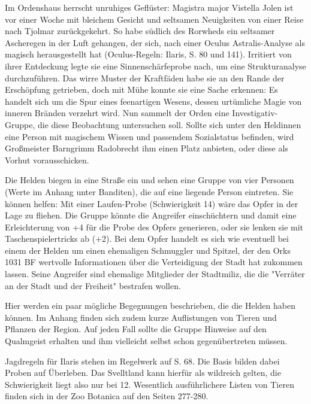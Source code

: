 Im Ordenshaus herrscht unruhiges Geflüster: Magistra major Vistella Jolen ist vor einer Woche mit bleichem Gesicht und seltsamen Neuigkeiten von einer Reise nach Tjolmar zurückgekehrt. So habe südlich des Rorwheds ein seltsamer Ascheregen in der Luft gehangen, der sich, nach einer Oculus Astralis-Analyse als magisch herausgestellt hat (Oculus-Regeln: Ilaris, S. 80 und 141). Irritiert von ihrer Entdeckung legte sie eine Sinnenschärfeprobe nach, um eine Strukturanalyse durchzuführen. Das wirre Muster der Kraftfäden habe sie an den Rande der Erschöpfung getrieben, doch mit Mühe konnte sie eine Sache erkennen: Es handelt sich um die Spur eines feenartigen Wesens, dessen urtümliche Magie von inneren Bränden verzehrt wird.
Nun sammelt der Orden eine Investigativ-Gruppe, die diese Beobachtung untersuchen soll. Sollte sich unter den Heldinnen eine Person mit magischem Wissen und passendem Sozialstatus befinden, wird Großmeister Barngrimm Radobrecht ihm einen Platz anbieten, oder diese als Vorhut vorausschicken.


Die Helden biegen in eine Straße ein und sehen eine Gruppe von vier Personen (Werte im Anhang unter Banditen), die auf eine liegende Person eintreten.
Sie können helfen: Mit einer Laufen-Probe (Schwierigkeit 14) wäre das Opfer in der Lage zu fliehen. Die Gruppe könnte die Angreifer einschüchtern und damit eine Erleichterung von +4 für die Probe des Opfers generieren, oder sie lenken sie mit Taschenspielertricks ab (+2).
Bei dem Opfer handelt es sich wie eventuell bei einem der Helden um einen ehemaligen Schmuggler und Spitzel, der den Orks 1031 BF wertvolle Informationen über die Verteidigung der Stadt hat zukommen lassen. Seine Angreifer sind ehemalige Mitglieder der Stadtmiliz, die die "Verräter an der Stadt und der Freiheit" bestrafen wollen.


Hier werden ein paar mögliche Begegnungen beschrieben, die die Helden haben können. Im Anhang finden sich zudem kurze Auflistungen von Tieren und Pflanzen der Region. Auf jeden Fall sollte die Gruppe Hinweise auf den Qualmgeist erhalten und ihm vielleicht selbst schon gegenübertreten müssen.

Jagdregeln für Ilaris stehen im Regelwerk auf S. 68. Die Basis bilden dabei Proben auf Überleben. Das Svelltland kann hierfür als wildreich gelten, die Schwierigkeit liegt also nur bei 12. Wesentlich ausführlichere Listen von Tieren finden sich in der Zoo Botanica auf den Seiten 277-280.

